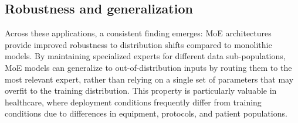 \subsection*{Robustness and generalization}

Across these applications, a consistent finding emerges: MoE architectures provide improved robustness to distribution shifts compared to monolithic models. By maintaining specialized experts for different data sub-populations, MoE models can generalize to out-of-distribution inputs by routing them to the most relevant expert, rather than relying on a single set of parameters that may overfit to the training distribution. This property is particularly valuable in healthcare, where deployment conditions frequently differ from training conditions due to differences in equipment, protocols, and patient populations.
